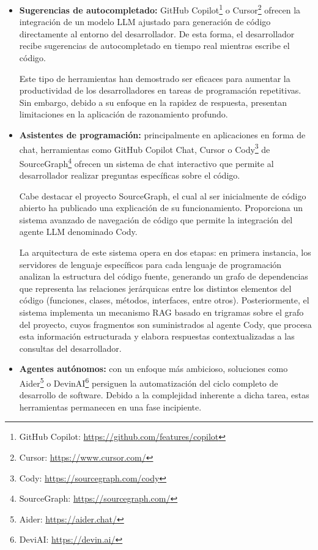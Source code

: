 \begin{itemize}
  \item {\textbf{Sugerencias de autocompletado:}} GitHub Copilot\footnote{GitHub Copilot: \url{https://github.com/features/copilot}} o Cursor\footnote{Cursor: \url{https://www.cursor.com/}} ofrecen la integración de un modelo LLM ajustado para generación de código directamente al entorno del desarrollador. De esta forma, el desarrollador recibe sugerencias de autocompletado en tiempo real mientras escribe el código.  

Este tipo de herramientas han demostrado ser eficaces para aumentar la productividad de los desarrolladores en tareas de programación repetitivas\cite{kalliamvakou_research_2022}. Sin embargo, debido a su enfoque en la rapidez de respuesta, presentan limitaciones en la aplicación de razonamiento profundo.

\item {\textbf{Asistentes de programación:}} principalmente en aplicaciones en forma de chat, herramientas como GitHub Copilot Chat, Cursor o Cody\footnote{Cody: \url{https://sourcegraph.com/cody}} de SourceGraph\footnote{SourceGraph: \url{https://sourcegraph.com/}} ofrecen un sistema de chat interactivo que permite al desarrollador realizar preguntas específicas sobre el código\cite{noauthor_github_nodate}.
  
Cabe destacar el proyecto SourceGraph, el cual al ser inicialmente de código abierto ha publicado una explicación de su funcionamiento. Proporciona un sistema avanzado de navegación de código que permite la integración del agente LLM denominado Cody.

La arquitectura de este sistema opera en dos etapas: en primera instancia, los servidores de lenguaje específicos para cada lenguaje de programación analizan la estructura del código fuente, generando un grafo de dependencias que representa las relaciones jerárquicas entre los distintos elementos del código (funciones, clases, métodos, interfaces, entre otros)\cite{noauthor_sourcegraphscip_2025}. Posteriormente, el sistema implementa un mecanismo RAG basado en trigramas sobre el grafo del proyecto, cuyos fragmentos son suministrados al agente Cody, que procesa esta información estructurada y elabora respuestas contextualizadas a las consultas del desarrollador\cite{noauthor_sourcegraphsourcegraph-public-snapshot_nodate}.

\item {\textbf{Agentes autónomos:}} con un enfoque más ambicioso, soluciones como Aider\footnote{Aider: \url{https://aider.chat/}} o DevinAI\footnote{DeviAI: \url{https://devin.ai/}} persiguen la automatización del ciclo completo de desarrollo de software. Debido a la complejidad inherente a dicha tarea, estas herramientas permanecen en una fase incipiente\cite{acharya_devin_2025}.


\end{itemize}
